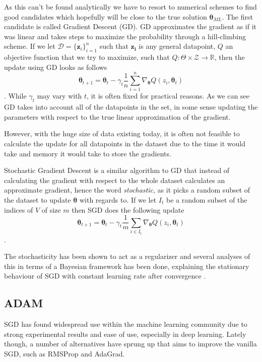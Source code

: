 As this can't be found analytically we have to resort to numerical schemes to
find good candidates which hopefully will be close to the true solution
$\bm{\theta}_{ML}$. The first candidate is called Gradient Descent (GD).
GD approximates the gradient as if it was linear and takes steps to maximize the
probability through a hill-climbing scheme. If we let $\mathcal{D} =
\{\bm{z}_i\}_{i = 1}^n$ such that $\bm{z_i}$ is any general datapoint, $Q$ an
objective function that we try to maximize, such that $Q : \Theta \times
\mathcal{Z} \to \mathbb{R}$, then the update using GD looks as follows
\begin{equation}
  \label{eq:GD_update}
  \bm{\theta}_{t + 1} = \bm{\theta}_t - \gamma_t \frac{1}{n} \sum_{i = 1}^n \nabla_{\bm{\theta}} Q(z_i, \bm{\theta}_t)
\end{equation}.
While $\gamma_t$ may vary with $t$, it is often fixed for practical reasons. As
we can see GD takes into account all of the datapoints in the set, in some sense
updating the parameters with respect to the true linear approximation of the gradient.

However, with the huge size of data existing today, it is often not feasible to
calculate the update for all datapoints in the dataset due to the time it would
take and memory it would take to store the gradients.

Stochastic Gradient Descent is a similar algorithm to GD that instead of
calculating the gradient with respect to the whole dataset calculates an
approximate gradient, hence the word \textit{stochastic}, as it picks a random
subset of the dataset to update $\bm{\theta}$ with regards to. If we let $I_t$
be a random subset of the indices of $V$ of size $m$ then SGD does the
following update
\begin{equation}
  \label{eq:SGD_update}
  \bm{\theta}_{t + 1} = \bm{\theta}_t - \gamma_t \frac{1}{m} \sum_{i \in I_t} \nabla_{\bm{\theta}} Q(z_i, \bm{\theta}_t)
\end{equation}\cite{series/lncs/Bottou12}\cite[p.~240]{Bishop:2006}.

The stochasticity has been shown to act as a regularizer and several analyses of
this in terms of a Bayesian framework has been done, explaining the stationary
behaviour of SGD with constant learning rate after convergence
\cite{mandt_stochastic_2017, mandt_variational_2016}.

\subsection{ADAM}
SGD has found widespread use within the machine learning community due to strong
experimental results and ease of use, especially in deep learning. Lately
though, a number of alternatives have sprung up that aims to improve the vanilla
SGD, such as RMSProp\cite{Tieleman2012} and AdaGrad\cite{Duchi:EECS-2010-24}.

